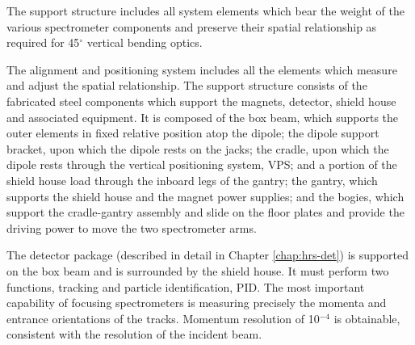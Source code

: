 The support structure includes all system elements which bear the weight 
of the various spectrometer components and preserve their spatial 
relationship as required for 45$^{\circ}$ vertical bending optics.

The alignment and positioning system includes all the elements which 
measure and adjust the spatial relationship.  The support structure 
consists of the fabricated steel components which support the magnets, 
detector, shield house and associated equipment.  It is composed of the 
box beam, which supports the outer elements in fixed relative position 
atop the dipole; the dipole support bracket, upon which the dipole rests on 
the jacks; the cradle, upon which the dipole rests through the vertical 
positioning system, VPS; and a portion of the shield house load through 
the inboard legs of the gantry; the gantry, which supports the shield 
house and the magnet power supplies; and the bogies, which support the 
cradle-gantry assembly and slide on the floor plates and provide the 
driving power to move the two spectrometer arms.

The detector package (described in detail in Chapter \ref{chap:hrs-det})
is supported on the box beam and is surrounded by 
the shield house.  It must perform two functions, tracking and particle 
identification, PID.  The most important capability of focusing 
spectrometers is measuring precisely the momenta and entrance 
orientations of the tracks.  Momentum resolution of 10$^{-4}$ is 
obtainable, consistent with the resolution of the incident beam.


